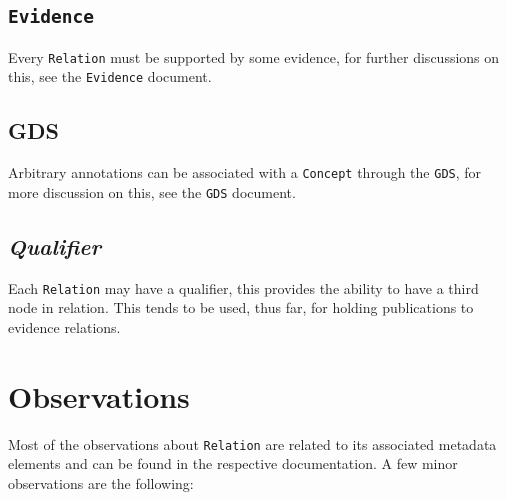 \documentclass[a4paper,10pt]{article}
\newcommand{\field}[1]{\textit{#1}\xspace}
\newcommand{\term}[1]{\texttt{#1}\xspace}
\newcommand{\co}{\term{Concept}}
\newcommand{\re}{\term{Relation}}
\begin{document}
\subsection{\term{Evidence}}
Every \re must be supported by some evidence, for further discussions on this, see the \term{Evidence} document.

\subsection{GDS}
Arbitrary annotations can be associated with a \co through the \term{GDS}, for more discussion on this, see the \term{GDS} document.

\subsection{\field{Qualifier}}
Each \re may have a qualifier, this provides the ability to have a third node in relation. This tends to be used, thus far, for holding publications to evidence relations.


\section{Observations}

Most of the observations about \re are related to its associated metadata elements and can be found in the respective documentation. A few minor observations are the following:
\end{document}
